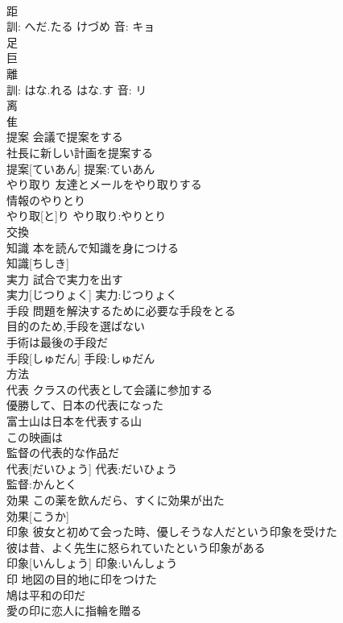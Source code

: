 \documentclass[8pt]{extreport}
\begin{document}
\begin{CJK}{UTF8}{min}
\\	距 
\\	訓: へだ.たる けづめ 音: キョ 
\\	足 
\\	巨 
\\	離 
\\	訓: はな.れる はな.す 音: リ 
\\	离 
\\	隹 
\\	提案	会議で提案をする 
\\	社長に新しい計画を提案する 
\\	提案[ていあん]			提案:ていあん
\\	やり取り	友達とメールをやり取りする 
\\	情報のやりとり 
\\	やり取[と]り			やり取り:やりとり
\\	交換 
\\	知識	本を読んで知識を身につける 
\\	知識[ちしき]						
\\	実力	試合で実力を出す 
\\	実力[じつりょく]			実力:じつりょく
\\	手段	問題を解決するために必要な手段をとる 
\\	目的のため,手段を選ばない 
\\	手術は最後の手段だ 
\\	手段[しゅだん]			手段:しゅだん
\\	方法 
\\	代表	クラスの代表として会議に参加する 
\\	優勝して、日本の代表になった 
\\	富士山は日本を代表する山 
\\	この映画は
\\	監督の代表的な作品だ 
\\	代表[だいひょう]			代表:だいひょう
\\	監督:かんとく
\\	効果	この薬を飲んだら、すくに効果が出た 
\\	効果[こうか]						
\\	印象	彼女と初めて会った時、優しそうな人だという印象を受けた 
\\	彼は昔、よく先生に怒られていたという印象がある 
\\	印象[いんしょう]			印象:いんしょう
\\	印	地図の目的地に印をつけた 
\\	鳩は平和の印だ 
\\	愛の印に恋人に指輪を贈る 

\end{CJK}
\end{document}
